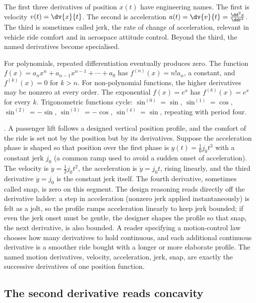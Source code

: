 The first three derivatives of position $x(t)$ have engineering
names. The first is velocity $v(t) = \dv{x}{t}$. The second is
acceleration $a(t) = \dv{v}{t} = \frac{\dd^{2} x}{\dd t^{2}}$.
The third is sometimes called jerk, the rate of change of
acceleration, relevant in vehicle ride comfort and in aerospace
attitude control. Beyond the third, the named derivatives become
specialised.

For polynomials, repeated differentiation eventually produces
zero. The function $f(x) = a_{n} x^{n} + a_{n - 1} x^{n - 1} +
\cdots + a_{0}$ has $f^{(n)}(x) = n! a_{n}$, a constant, and
$f^{(k)}(x) = 0$ for $k > n$. For non-polynomial functions, the
higher derivatives may be nonzero at every order. The exponential
$f(x) = e^{x}$ has $f^{(k)}(x) = e^{x}$ for every $k$.
Trigonometric functions cycle: $\sin^{(0)} = \sin$,
$\sin^{(1)} = \cos$, $\sin^{(2)} = -\sin$, $\sin^{(3)} = -\cos$,
$\sin^{(4)} = \sin$, repeating with period four.

. A
passenger lift follows a designed vertical position profile, and the
comfort of the ride is set not by the position but by its
derivatives. Suppose the acceleration phase is shaped so that
position over the first phase is $y(t) = \tfrac{1}{6} j_{0} t^{3}$
with a constant jerk $j_{0}$ (a common ramp used to avoid a sudden
onset of acceleration). The velocity is $\dot{y} = \tfrac{1}{2}
j_{0} t^{2}$, the acceleration is $\ddot{y} = j_{0} t$, rising
linearly, and the third derivative $\dddot{y} = j_{0}$ is the
constant jerk itself. The fourth derivative, sometimes called snap,
is zero on this segment. The design reasoning reads directly off the
derivative ladder: a step in acceleration (nonzero jerk applied
instantaneously) is felt as a jolt, so the profile ramps
acceleration linearly to keep jerk bounded; if even the jerk onset
must be gentle, the designer shapes the profile so that snap, the
next derivative, is also bounded. A reader specifying a
motion-control law chooses how many derivatives to hold continuous,
and each additional continuous derivative is a smoother ride bought
with a longer or more elaborate profile. The named motion
derivatives, velocity, acceleration, jerk, snap, are exactly the
successive derivatives of one position function.

\subsection{The second derivative reads concavity}

